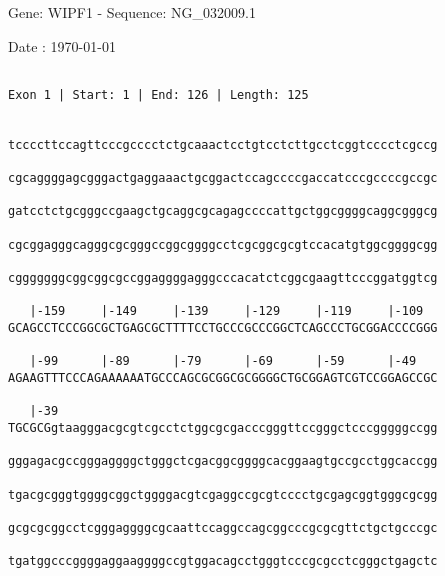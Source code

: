 \documentclass{article}
\begin{document}
\begin{center}
\begin{large}
 Gene: WIPF1 - Sequence: NG\_032009.1
 
 Date : \today
\end{large}
\end{center}
 \begin{Verbatim}
 
Exon 1 | Start: 1 | End: 126 | Length: 125


tccccttccagttcccgcccctctgcaaactcctgtcctcttgcctcggtcccctcgccg
                                                            
cgcaggggagcgggactgaggaaactgcggactccagccccgaccatcccgccccgccgc
                                                            
gatcctctgcgggccgaagctgcaggcgcagagccccattgctggcggggcaggcgggcg
                                                            
cgcggagggcagggcgcgggccggcggggcctcgcggcgcgtccacatgtggcggggcgg
                                                            
cgggggggcggcggcgccggaggggagggcccacatctcggcgaagttcccggatggtcg
                                                            
   |-159     |-149     |-139     |-129     |-119     |-109  
GCAGCCTCCCGGCGCTGAGCGCTTTTCCTGCCCGCCCGGCTCAGCCCTGCGGACCCCGGG
                                                            
   |-99      |-89      |-79      |-69      |-59      |-49   
AGAAGTTTCCCAGAAAAAATGCCCAGCGCGGCGCGGGGCTGCGGAGTCGTCCGGAGCCGC
                                                            
   |-39                                                     
TGCGCGgtaagggacgcgtcgcctctggcgcgacccgggttccgggctcccgggggccgg
                                                            
gggagacgccgggaggggctgggctcgacggcggggcacggaagtgccgcctggcaccgg
                                                            
tgacgcgggtggggcggctggggacgtcgaggccgcgtcccctgcgagcggtgggcgcgg
                                                            
gcgcgcggcctcgggaggggcgcaattccaggccagcggcccgcgcgttctgctgcccgc
                                                            
tgatggcccggggaggaaggggccgtggacagcctgggtcccgcgcctcgggctgagctc
                                                            

\end{Verbatim}
\end{document}
